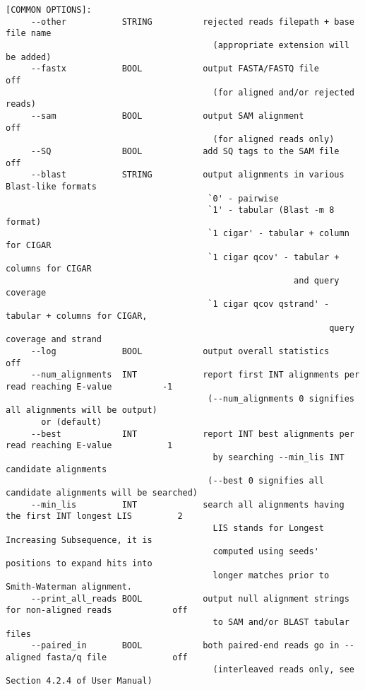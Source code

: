 \documentclass[10pt,a4paper]{article}
\begin{document}
\begin{Verbatim}[fontsize=\footnotesize]
   [COMMON OPTIONS]: 
     --other           STRING          rejected reads filepath + base file name
                                         (appropriate extension will be added)
     --fastx           BOOL            output FASTA/FASTQ file                                        off
                                         (for aligned and/or rejected reads)
     --sam             BOOL            output SAM alignment                                           off
                                         (for aligned reads only)
     --SQ              BOOL            add SQ tags to the SAM file                                    off
     --blast           STRING          output alignments in various Blast-like formats                
                                        `0' - pairwise
                                        `1' - tabular (Blast -m 8 format)
                                        `1 cigar' - tabular + column for CIGAR 
                                        `1 cigar qcov' - tabular + columns for CIGAR
                                                         and query coverage
                                        `1 cigar qcov qstrand' - tabular + columns for CIGAR,
                                                                query coverage and strand
     --log             BOOL            output overall statistics                                      off
     --num_alignments  INT             report first INT alignments per read reaching E-value          -1
                                        (--num_alignments 0 signifies all alignments will be output)
       or (default)
     --best            INT             report INT best alignments per read reaching E-value           1
                                         by searching --min_lis INT candidate alignments
                                        (--best 0 signifies all candidate alignments will be searched)
     --min_lis         INT             search all alignments having the first INT longest LIS         2
                                         LIS stands for Longest Increasing Subsequence, it is 
                                         computed using seeds' positions to expand hits into
                                         longer matches prior to Smith-Waterman alignment. 
     --print_all_reads BOOL            output null alignment strings for non-aligned reads            off
                                         to SAM and/or BLAST tabular files
     --paired_in       BOOL            both paired-end reads go in --aligned fasta/q file             off
                                         (interleaved reads only, see Section 4.2.4 of User Manual)

\end{Verbatim}
\end{document}
